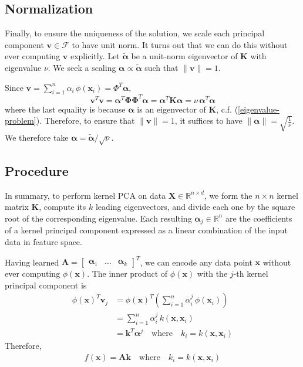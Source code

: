 \documentclass[]{article}
\newcommand{\reals}{\mathbb{R}}
\begin{document}
\subsection{Normalization}

Finally, to ensure the uniqueness of the solution, we scale each principal component $\mathbf{v} \in \mathcal{F}$ to have unit norm.
It turns out that we can do this without ever computing $\mathbf{v}$ explicitly.
Let $\tilde{\boldsymbol{\alpha}}$ be a unit-norm eigenvector of $\mathbf{K}$ with eigenvalue $\nu$.
We seek a scaling $\boldsymbol{\alpha} \propto \tilde{\boldsymbol{\alpha}}$ such that $\| \mathbf{v} \| = 1$.

Since $\mathbf{v} = \sum_{i=1}^n \alpha_i  \, \phi(\mathbf{x}_i) = \Phi^T \boldsymbol{\alpha}$,
$$ \mathbf{v}^T \mathbf{v} = \boldsymbol{\alpha}^T \boldsymbol{\Phi} \boldsymbol{\Phi}^T \boldsymbol{\alpha} = \boldsymbol{\alpha}^T \mathbf{K} \boldsymbol{\alpha}  = \nu \, \boldsymbol{\alpha}^T\boldsymbol{\alpha} $$
where the last equality is because $\boldsymbol{\alpha}$ is an eigenvector of $\mathbf{K}$, c.f. (\ref{eigenvalue-problem}).
Therefore, to ensure that $\| \mathbf{v} \| = 1$, it suffices to have $\| \boldsymbol{\alpha}\| = \sqrt{\frac{1}{ \nu }}$.
We therefore take $\boldsymbol{\alpha} = \tilde{\boldsymbol{\alpha}} / \sqrt{\nu}$.

\subsection{Procedure}

In summary, to perform kernel PCA on data $\mathbf{X} \in \reals^{n \times d}$, we form the $n \times n$ kernel matrix $\mathbf{K}$, compute its $k$ leading eigenvectors, and divide each one by the square root of the corresponding eigenvalue.
Each resulting $\boldsymbol{\alpha}_j \in \reals^n$ are the coefficients of a kernel principal component expressed as a linear combination of the input data in feature space.

Having learned $\mathbf{A} = \begin{bmatrix} \boldsymbol{\alpha}_1 & \hdots & \boldsymbol{\alpha}_k \end{bmatrix}^T$, we can encode any data point $\mathbf{x}$ without ever computing $\phi(\mathbf{x})$.
The inner product of $\phi(\mathbf{x})$ with the $j$-th kernel principal component is 
\begin{align*}
\phi(\mathbf{x})^T \mathbf{v}_j &= \phi(\mathbf{x})^T  \left( \sum_{i=1}^n \alpha^j_i \, \phi(\mathbf{x}_i) \right) \\
&=  \sum_{i=1}^n \alpha^j_i \, k(\mathbf{x}, \mathbf{x}_i) \\
&= \mathbf{k}^T \boldsymbol{\alpha}^j \quad \text{where} \quad k_i = k(\mathbf{x}, \mathbf{x}_i)
\end{align*}
Therefore,
\begin{align}
f(\mathbf{x}) = \mathbf{A} \mathbf{k} \quad \text{where}  \quad k_i = k(\mathbf{x}, \mathbf{x}_i)
\end{align}
\end{document}
